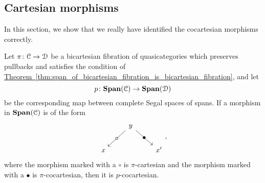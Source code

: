 \documentclass[main.tex]{subfiles}
\begin{document}
\subsection{Cartesian morphisms}
\label{ssc:cartesian_morphisms}

In this section, we show that we really have identified the cocartesian morphisms correctly. 

\begin{proposition}
  \label{prop:form_of_cocartesian_morphisms_in_spans}
  Let $\pi\colon \mathcal{C} \to \mathcal{D}$ be a bicartesian fibration of quasicategories which preserves pullbacks and satisfies the condition of \hyperref[thm:span_of_bicartesian_fibration_is_bicartesian_fibration]{Theorem~\ref*{thm:span_of_bicartesian_fibration_is_bicartesian_fibration}}, and let
  \begin{equation*}
    p\colon \mathbf{Span}(\mathcal{C}) \to \mathbf{Span}(\mathcal{D})
  \end{equation*}
  be the corresponding map between complete Segal spaces of spans. If a morphism in $\mathbf{Span}(\mathcal{C})$ is of the form
  \begin{equation*}
    \label{eq:form_of_p_cocartesian_morphisms}
    \begin{tikzcd}
      & y
      \arrow[dl, "\circ" marking]
      \arrow[dr, "\bullet" marking]
      \\
      x
      && x'
    \end{tikzcd},
  \end{equation*}
  where the morphism marked with a $\circ$ is $\pi$-cartesian and the morphism marked with a $\bullet$ is $\pi$-cocartesian, then it is $p$-cocartesian.
\end{proposition}
\end{document}
